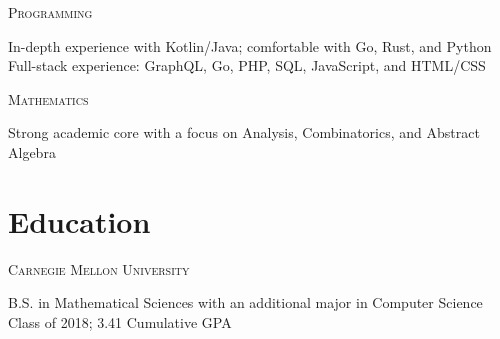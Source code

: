 \documentclass[letterpaper,10pt]{article}
\newenvironment{lcol}
{
    \begin{minipage}[t]{.18\linewidth}
    \begin{flushright}
}
{
    \end{flushright}
    \end{minipage}
}
\newenvironment{rcol}
{
    \hspace{.005\linewidth}
    \begin{minipage}[t]{.8\linewidth}
}
{
    \end{minipage}
}
\begin{document}
\begin{lcol}
    \textsc{Programming}
\end{lcol}
\begin{rcol}
    In-depth experience with Kotlin/Java; comfortable with Go, Rust, and Python
    \vspace{2pt} \\
    Full-stack experience: GraphQL, Go, PHP, SQL, JavaScript, and HTML/CSS
\end{rcol}

\vspace{6pt}

\begin{lcol}
    \textsc{Mathematics}
\end{lcol}
\begin{rcol}
    Strong academic core with a focus on Analysis, Combinatorics, and Abstract Algebra
\end{rcol}

\section{Education}

\begin{lcol}
    \textsc{Carnegie Mellon University}
\end{lcol}
\begin{rcol}
    B.S. in Mathematical Sciences with an additional major in Computer Science
    \vspace{4pt} \\
    Class of 2018; 3.41 Cumulative GPA
\end{rcol}
\end{document}
